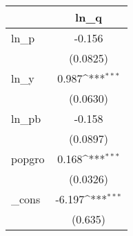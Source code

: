 {
\def\sym#1{\ifmmode^{#1}\else\(^{#1}\)\fi}
\begin{tabular}{l*{1}{c}}
\hline\hline
            &\multicolumn{1}{c}{ln\_q}\\
\hline
ln\_p        &      -0.156         \\
            &    (0.0825)         \\
[1em]
ln\_y        &       0.987\sym{***}\\
            &    (0.0630)         \\
[1em]
ln\_pb       &      -0.158         \\
            &    (0.0897)         \\
[1em]
popgro      &       0.168\sym{***}\\
            &    (0.0326)         \\
[1em]
\_cons      &      -6.197\sym{***}\\
            &     (0.635)         \\
\hline\hline
\end{tabular}
}
